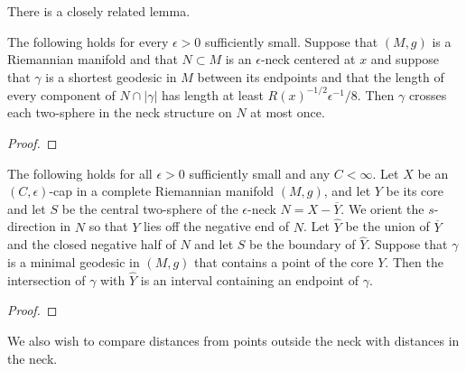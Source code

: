 There is a closely related lemma.

\begin{lemma}
\label{lem:geodesic-crosses-neck-once-general}
\label{genint}
The following holds for every $\epsilon>0$ sufficiently small.
Suppose that $(M,g)$ is a Riemannian manifold and that $N\subset M$
is an $\epsilon$-neck centered at $x$ and suppose that $\gamma$ is a
shortest geodesic in $M$ between its endpoints and that the length
of every component of $N\cap|\gamma|$ has length at least $
R(x)^{-1/2}\epsilon^{-1}/8$. Then $\gamma$ crosses each two-sphere
in the neck structure on $N$ at most once.
\end{lemma}


\begin{proof}
\sketch
{}
\end{proof}


\begin{corollary}
\label{cor:minimal-geodesic-through-core}
\label{coreint}
The following holds for all $\epsilon>0$ sufficiently small and any
$C<\infty$. Let $X$ be an $(C,\epsilon)$-cap in a complete
Riemannian manifold $(M,g)$, and let $Y$ be its core and let $S$ be
the central two-sphere of the $\epsilon$-neck $N=X-\overline Y$. We
orient the $s$-direction in $N$ so that $Y$ lies off the negative
end of $N$. Let $\widehat Y$ be the union of $\overline Y$ and the
closed negative half of $N$ and let $S$ be the boundary of $\widehat
Y$. Suppose that $\gamma$ is a minimal geodesic in $(M,g)$ that
contains a point of the core $Y$. Then the intersection of $\gamma$
with $\widehat Y$ is an interval containing an endpoint of $\gamma$.
\end{corollary}



\begin{proof}
\sketch
{}
\end{proof}




We also wish to compare distances from points outside the neck with
distances in the neck.


